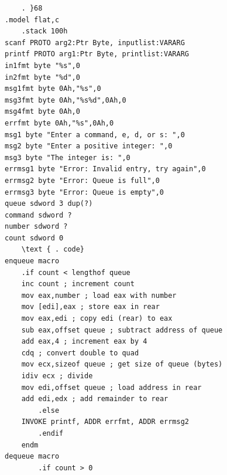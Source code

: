 \documentclass[10pt]{book}
\begin{document}
\begin{verbatim}
    . }68
.model flat,c
    .stack 100h
scanf PROTO arg2:Ptr Byte, inputlist:VARARG
printf PROTO arg1:Ptr Byte, printlist:VARARG
in1fmt byte "%s",0
in2fmt byte "%d",0
msg1fmt byte 0Ah,"%s",0
msg3fmt byte 0Ah,"%s%d",0Ah,0
msg4fmt byte 0Ah,0
errfmt byte 0Ah,"%s",0Ah,0
msg1 byte "Enter a command, e, d, or s: ",0
msg2 byte "Enter a positive integer: ",0
msg3 byte "The integer is: ",0
errmsg1 byte "Error: Invalid entry, try again",0
errmsg2 byte "Error: Queue is full",0
errmsg3 byte "Error: Queue is empty",0
queue sdword 3 dup(?)
command sdword ?
number sdword ?
count sdword 0
    \text { . code}
enqueue macro
    .if count < lengthof queue
    inc count ; increment count
    mov eax,number ; load eax with number
    mov [edi],eax ; store eax in rear
    mov eax,edi ; copy edi (rear) to eax
    sub eax,offset queue ; subtract address of queue
    add eax,4 ; increment eax by 4
    cdq ; convert double to quad
    mov ecx,sizeof queue ; get size of queue (bytes)
    idiv ecx ; divide
    mov edi,offset queue ; load address in rear
    add edi,edx ; add remainder to rear
        .else
    INVOKE printf, ADDR errfmt, ADDR errmsg2
        .endif
    endm
dequeue macro
        .if count > 0
\end{verbatim}
\end{document}
